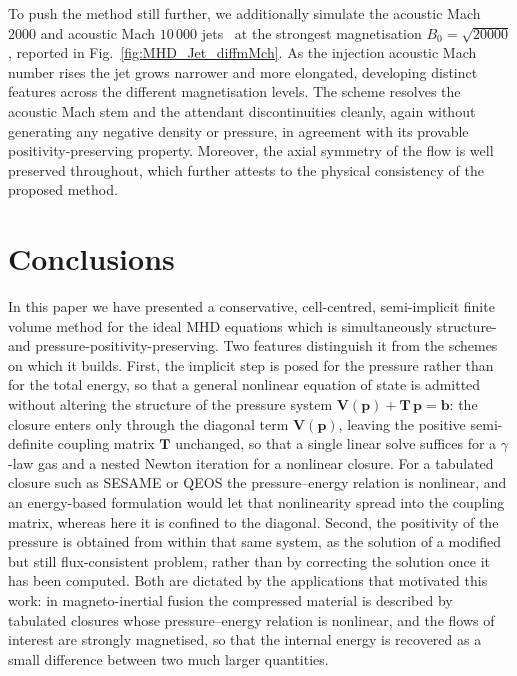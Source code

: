 \documentclass[a4paper,fleqn]{cas-sc}
\theoremstyle{definition}
\theoremstyle{remark}
\begin{document}
To push the method still further, we additionally simulate the acoustic Mach $2000$ and
acoustic Mach $10\,000$ jets~\cite{wu2018,activeflux} at the strongest magnetisation
$B_0 = \sqrt{20000}$, reported in Fig.~\ref{fig:MHD_Jet_diffmMch}. As the injection acoustic Mach number rises the jet grows
narrower and more elongated, developing distinct features across the different
magnetisation levels. The scheme resolves the acoustic Mach stem and the attendant
discontinuities cleanly, again without generating any negative density or
pressure, in agreement with its provable positivity-preserving property.
Moreover, the axial symmetry of the flow is well preserved throughout, which
further attests to the physical consistency of the proposed method.



\section{Conclusions}
\label{sec:conclusions}

In this paper we have presented a conservative, cell-centred, semi-implicit finite volume
method for the ideal MHD equations which is simultaneously structure- and
pressure-positivity-preserving. Two features distinguish it from the schemes on which it
builds. First, the implicit step is posed for the pressure rather than for the total
energy, so that a general nonlinear equation of state is admitted without altering the
structure of the pressure system $\mathbf{V}(\mathbf{p}) + \mathbf{T}\,\mathbf{p} =
\mathbf{b}$: the closure enters only through the diagonal term $\mathbf{V}(\mathbf{p})$,
leaving the positive semi-definite coupling matrix $\mathbf{T}$ unchanged, so
that a single linear solve suffices for a $\gamma$-law gas and a nested Newton iteration
for a nonlinear closure. For a tabulated closure such as SESAME or QEOS the
pressure--energy relation is nonlinear, and an energy-based formulation would let that
nonlinearity spread into the coupling matrix, whereas here it is confined to the diagonal.
Second, the positivity of the pressure is obtained from within that same system, as the
solution of a modified but still flux-consistent problem, rather than by correcting the
solution once it has been computed. Both are dictated by the applications that motivated
this work: in magneto-inertial fusion the compressed material is described by tabulated
closures whose pressure--energy relation is nonlinear, and the flows of interest are
strongly magnetised, so that the internal energy is recovered as a small difference
between two much larger quantities.
\end{document}
